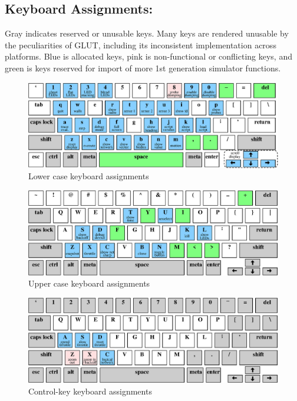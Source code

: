 \documentclass{article}
\begin{document}
\begin{appendix}
\section{Keyboard Assignments:}

Gray indicates reserved or unusable keys.  Many keys are rendered
unusable by the peculiarities of GLUT, including its inconsistent
implementation across platforms.  Blue is allocated keys, pink is
non-functional or conflicting keys, and green is keys reserved for
import of more 1st generation simulator functions.

\begin{figure}[hp]
\centering
\includegraphics[width=6in]{figures/keyboard-lower.eps}
\caption{Lower case keyboard assignments}
\end{figure}

\begin{figure}[hp]
\centering
\includegraphics[width=6in]{figures/keyboard-upper.eps}
\caption{Upper case keyboard assignments}
\end{figure}

\begin{figure}[hp]
\centering
\includegraphics[width=6in]{figures/keyboard-ctrl.eps}
\caption{Control-key keyboard assignments}
\end{figure}


\end{appendix}
\end{document}
